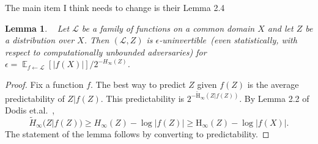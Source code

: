 \documentclass[11pt]{article}
\DeclareMathOperator*{\expe}{\mathbb{E}}
\newcommand{\Hoo}{\mathrm{H}_\infty}
\newcommand{\Hav}{\tilde{\mathrm{H}}_\infty}
\newtheorem{lemma}[theorem]{Lemma}
\begin{document}
{The main item I think needs to change is their Lemma 2.4
\begin{lemma}~\cite[Min-Entropy Version of Lemma 2.4]{micciancio2013hardness}
Let $\mathcal{L}$ be a family of functions on a common domain $X$ and let $Z$ be a distribution over $X$.  Then $(\mathcal{L}, Z)$ is $\epsilon$-uninvertible~(even statistically, with respect to computationally unbounded adversaries) for $\epsilon = \expe_{f\leftarrow \mathcal{L}} [|f(X)|]/ 2^{-H_\infty(Z)}$.
\end{lemma}
\begin{proof}
Fix a function $f$.  The best way to predict $Z$ given $f(Z)$ is the average predictability of $Z | f(Z)$.  This predictability is $2^{-\Hav(Z | f(Z))}$.  By Lemma 2.2 of Dodis et.al.~\cite{DBLP:journals/siamcomp/DodisORS08}, 
\[
\tilde{H}_\infty(Z | f(Z))\geq H_\infty(Z) - \log |f(Z)| \geq \Hoo(Z) - \log |f(X)|.
\]
  The statement of the lemma follows by converting to predictability.
\end{proof}

}
\end{document}
